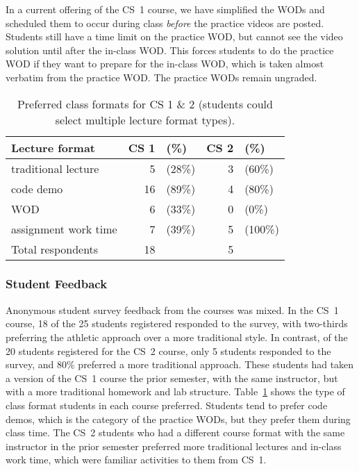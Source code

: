 In a current offering of the CS~1 course, we have simplified the WODs and scheduled them to occur during class \emph{before} the practice videos are posted. Students still have a time limit on the practice WOD, but cannot see the video solution until after the in-class WOD. This forces students to do the practice WOD if they want to prepare for the in-class WOD, which is taken almost verbatim from the practice WOD. The practice WODs remain ungraded.


\begin{table}

\begin{center}
\begin{tabular}{lrlrl}
Lecture format & CS 1 & (\%) & CS 2 & (\%) \\
\hline
traditional lecture & 5 & (28\%)  & 3 & (60\%)\\
code demo & 16 & (89\%)  & 4 & (80\%)  \\
WOD &  6 & (33\%) & 0 & (0\%) \\
assignment work time & 7  & (39\%) & 5 & (100\%) \\
\hline
Total respondents &  18 &  & 5 &  \\

\end{tabular}
\end{center}
\caption{Preferred class formats for CS 1 \& 2 (students could select multiple lecture format types).}
\label{tab:format}
\end{table}

\subsubsection{Student Feedback}


Anonymous student survey feedback from the courses was mixed. In the CS~1 course, 18 of the 25 students registered responded to the survey, with two-thirds preferring the athletic approach over a more traditional style. In contrast, of the 20 students registered for the CS~2 course, only 5 students responded to the survey, and 80\% preferred a more traditional approach. 
These students had taken a version of the CS~1 course the prior semester, with the same instructor, but with a more traditional homework and lab structure. Table~\ref{tab:format} shows the type of class format students in each course preferred. Students tend to prefer code demos, which is the category of the practice WODs, but they prefer them during class time. The CS~2 students who had a different course format with the same instructor in the prior semester preferred more traditional lectures and in-class work time, which were familiar activities to them from CS~1.

